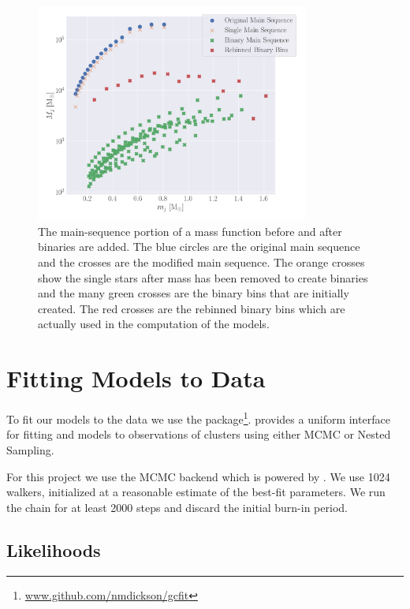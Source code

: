 \begin{figure}
    \centering
    \includegraphics[width=0.8\textwidth]{figures/shifted-mf.png}
    \caption{The main-sequence portion of a mass function before and after binaries are added. The
        blue circles are the original main sequence and the crosses are the modified main sequence.
        The orange crosses show the single stars after mass has been removed to create binaries and
        the many green crosses are the binary bins that are initially created. The red crosses are
        the rebinned binary bins which are actually used in the computation of the 
        models.}
    \label{fig:2/shifted-mf}
\end{figure}



\section{Fitting Models to Data}


To fit our models to the data we use the 
package\footnote{\url{www.github.com/nmdickson/gcfit}}.  provides a uniform interface
for fitting \evolvemf{} and  models to observations of clusters using either MCMC or
Nested Sampling.

For this project we use the MCMC backend which is powered by 
\citet{Foreman-Mackey2013,Foreman-Mackey2019}. We use 1024 walkers, initialized at a reasonable
estimate of the best-fit parameters. We run the chain for at least 2000 steps and discard the
initial burn-in period.

\subsection{Likelihoods}

